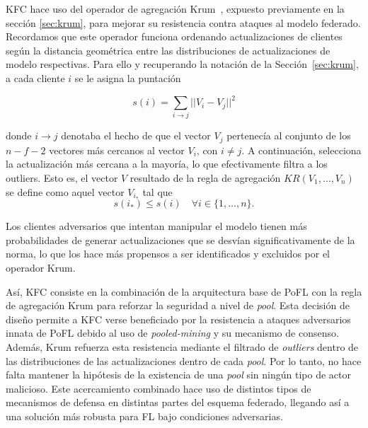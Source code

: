 \ac{KFC} hace uso del operador de agregación Krum~\cite{krum-2017}, expuesto previamente en la sección \ref{sec:krum}, para mejorar su resistencia contra ataques al modelo federado. Recordamos que este operador funciona ordenando actualizaciones de clientes según la distancia geométrica entre las distribuciones de actualizaciones de modelo respectivas. Para ello y recuperando la notación de la Sección~\ref{sec:krum}, a cada cliente $i$ se le asigna la puntación

\begin{equation}
    s(i) = \sum_{i\to j} || V_i - V_j ||^2
\end{equation}

donde $i \to j$ denotaba el hecho de que el vector $V_j$ pertenecía al conjunto de los $n-f-2$ vectores más cercanos al vector $V_i$, con $i \ne j$. A continuación, selecciona la actualización más cercana a la mayoría, lo que efectivamente filtra a los outliers. Esto es, el vector $V$ resultado de la regla de agregación $KR(V_1, \ldots, V_n)$ se define como aquel vector $V_{i_*}$ tal que
\begin{equation}
    s(i_*) \le s(i) \quad \forall i \in \{ 1, \ldots, n\}.
\end{equation}


Los clientes adversarios que intentan manipular el modelo tienen más probabilidades de generar actualizaciones que se desvían significativamente de la norma, lo que los hace más propensos a ser identificados y excluidos por el operador Krum. 

Así, \ac{KFC} consiste en la combinación de la arquitectura base de \ac{PoFL} con la regla de agregación Krum para reforzar la seguridad a nivel de \textit{pool}. Esta decisión de diseño permite a \ac{KFC} verse beneficiado por la resistencia a ataques adversarios innata de \ac{PoFL} debido al uso de \textit{pooled-mining} y su mecanismo de consenso. Además, Krum refuerza esta resistencia mediante el filtrado de \textit{outliers} dentro de las distribuciones de las actualizaciones dentro de cada \textit{pool}. Por lo tanto, no hace falta mantener la hipótesis de la existencia de una \textit{pool} sin ningún tipo de actor malicioso. Este acercamiento combinado hace uso de distintos tipos de mecanismos de defensa en distintas partes del esquema federado, llegando así a una solución más robusta para \ac{FL} bajo condiciones adversarias.